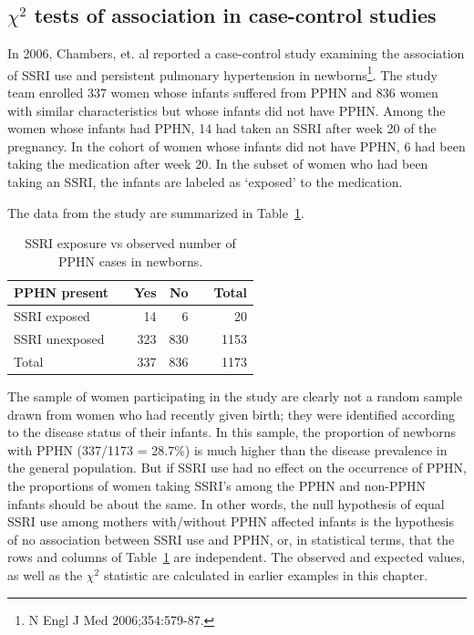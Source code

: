 \subsection{$\chi^2$ tests of association in case-control studies}
\label{caseControlTests}




In 2006, Chambers, et. al reported a case-control study examining the association of SSRI use and persistent pulmonary hypertension in newborns\footnote{N Engl J Med 2006;354:579-87.}.  The study team enrolled 337 women whose infants suffered from PPHN and 836 women with similar characteristics but whose infants did not have PPHN.  Among the women whose infants had PPHN, 14 had taken an SSRI after week 20 of the pregnancy.  In the cohort of women whose infants did not have PPHN, 6 had been taking the medication after week 20. In the subset of women who had been taking an SSRI, the infants are labeled as `exposed' to the medication.

The data from the study are summarized in Table~\ref{ssriPPHNObserved}.

\begin{table}[h]
	\centering
	\begin{tabular}{ll rrr r}
		\hline
		PPHN present	 & \hspace{2mm} & Yes & No & \hspace{2mm} & Total \\
		\hline
		SSRI exposed &	& 14 & 6 &  & 20  \\
		SSRI unexposed & & 323 & 830 &  & 1153  \\
        Total & & 337 & 836 & & 1173 \\
		\hline
	\end{tabular}
	\caption{SSRI exposure vs observed number of PPHN cases in newborns.}
    \label{ssriPPHNObserved}
\end{table}	

The sample of women participating in the study are clearly not a random sample drawn from women who had recently given birth; they were identified according to the disease status of their infants.  In this sample, the proportion of newborns with PPHN (337/1173 = 28.7\%) is much higher than the disease prevalence in the general population.  But if SSRI use had no effect on the occurrence of PPHN, the proportions of women taking SSRI's among the PPHN and non-PPHN infants should be about the same.  In other words, the null hypothesis of equal SSRI use among mothers with/without PPHN affected infants is the hypothesis of no association between SSRI use and PPHN, or, in statistical terms, that the rows and columns of Table~\ref{ssriPPHNObserved} are independent.  The observed and expected values, as well as the $\chi^2$ statistic are calculated in earlier examples in this chapter.

